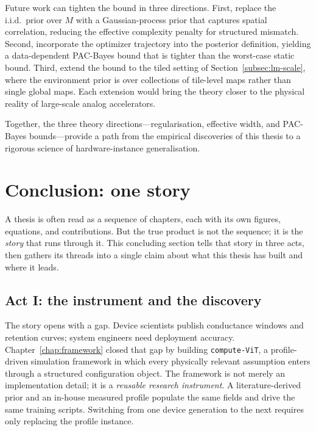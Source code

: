 Future work can tighten the bound in three directions.  First, replace the i.i.d.~prior over $M$ with a Gaussian-process prior that captures spatial correlation, reducing the effective complexity penalty for structured mismatch.  Second, incorporate the optimizer trajectory into the posterior definition, yielding a data-dependent PAC-Bayes bound that is tighter than the worst-case static bound.  Third, extend the bound to the tiled setting of Section~\ref{subsec:lm-scale}, where the environment prior is over collections of tile-level maps rather than single global maps.  Each extension would bring the theory closer to the physical reality of large-scale analog accelerators.

Together, the three theory directions---regularisation, effective width, and PAC-Bayes bounds---provide a path from the empirical discoveries of this thesis to a rigorous science of hardware-instance generalisation.


\section{Conclusion: one story}
\label{sec:conclusion}

A thesis is often read as a sequence of chapters, each with its own figures, equations, and contributions.  But the true product is not the sequence; it is the \emph{story} that runs through it.  This concluding section tells that story in three acts, then gathers its threads into a single claim about what this thesis has built and where it leads.

\subsection{Act I: the instrument and the discovery}

The story opens with a gap.  Device scientists publish conductance windows and retention curves; system engineers need deployment accuracy.  Chapter~\ref{chap:framework} closed that gap by building \texttt{compute-ViT}, a profile-driven simulation framework in which every physically relevant assumption enters through a structured configuration object.  The framework is not merely an implementation detail; it is a \emph{reusable research instrument}.  A literature-derived prior and an in-house measured profile populate the same fields and drive the same training scripts.  Switching from one device generation to the next requires only replacing the profile instance.

